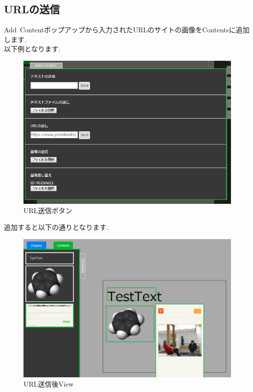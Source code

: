 \documentclass[a4paper,10pt,oneside]{jsbook}
\begin{document}
\subsection{URLの送信}
Add\ Contentポップアップから入力されたURLのサイトの画像をContentsに追加します.\\
以下例となります.\\
\begin{figure}[htbp]
	\begin{center}
		\includegraphics[width=12.5cm]{image/AddContent_URL.PNG}

	\end{center}
	\caption{URL送信ボタン}
	\label{fig:urlsend}
\end{figure}

追加すると以下の通りとなります.\\


\begin{figure}[htbp]
	\begin{center}
		\includegraphics[width=12.5cm]{image/AddContent_URL_View.PNG}
	\end{center}
	\caption{URL送信後View}
	\label{fig:sendurl}
\end{figure}
\end{document}
